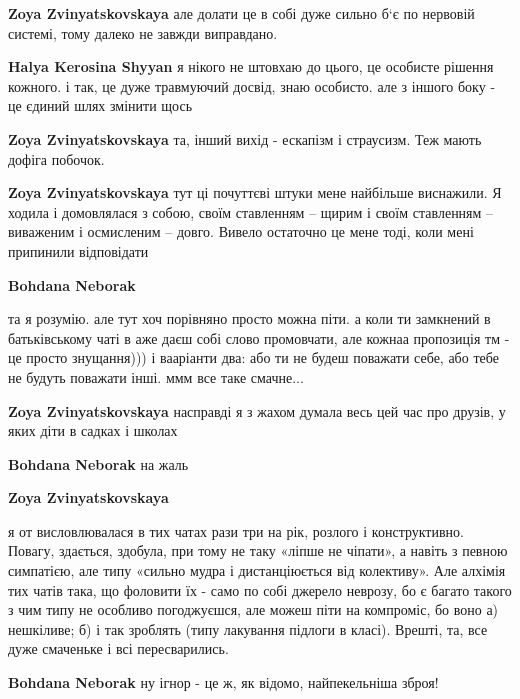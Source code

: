 \begin{itemize}
\begin{itemize} %
\textbf{Zoya Zvinyatskovskaya} але долати це в собі дуже сильно б‘є по нервовій системі, тому далеко не завжди виправдано.


\textbf{Halya Kerosina Shyyan} я нікого не штовхаю до цього, це особисте рішення кожного. і так, це дуже травмуючий досвід, знаю особисто. але з іншого боку - це єдиний шлях змінити щось

\textbf{Zoya Zvinyatskovskaya} та, інший вихід - ескапізм і страусизм. Теж мають дофіга побочок.

\textbf{Zoya Zvinyatskovskaya} тут ці почуттєві штуки мене найбільше виснажили. Я ходила і домовлялася з собою, своїм ставленням – щирим і своїм ставленням – виваженим і осмисленим – довго. Вивело остаточно це мене тоді, коли мені припинили відповідати


\textbf{Bohdana Neborak} 

та я розумію. але тут хоч порівняно просто можна піти. а коли ти замкнений в
батьківському чаті в аже даєш собі слово промовчати, але кожнаа пропозиція тм -
це просто знущання))) і вааріанти два: або ти не будеш поважати себе, або тебе
не будуть поважати інші. ммм все таке смачне...

\textbf{Zoya Zvinyatskovskaya} насправді я з жахом думала весь цей час про друзів, у яких діти в садках і школах


\textbf{Bohdana Neborak} на жаль

\textbf{Zoya Zvinyatskovskaya} 

я от висловлювалася в тих чатах рази три на рік, розлого і конструктивно.
Повагу, здається, здобула, при тому не таку «ліпше не чіпати», а навіть з
певною симпатією, але типу «сильно мудра і дистанціюється від колективу». Але
алхімія тих чатів така, що фоловити їх - само по собі джерело неврозу, бо є
багато такого з чим типу не особливо погоджуєшся, але можеш піти на компроміс,
бо воно а) нешкіливе; б) і так зроблять (типу лакування підлоги в класі).
Врешті, та, все дуже смаченьке і всі пересварились.


\textbf{Bohdana Neborak} ну ігнор - це ж, як відомо, найпекельніша зброя!


\end{itemize}
\end{itemize}
